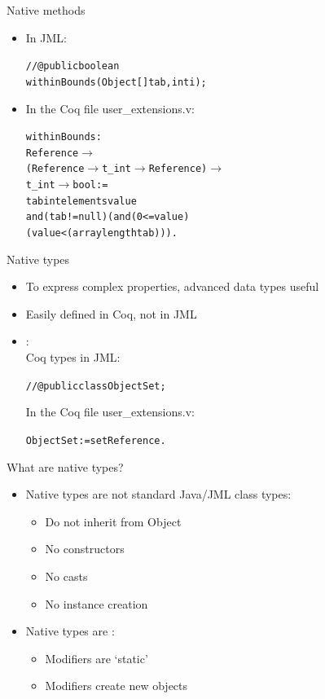 \documentclass[final,nocolorBG,a4,mobius,nototal,pdf,slideColor]{prosper}
\begin{document}
\begin{slide}{Native methods}
\begin{itemize}
\item In JML:
\begin{alltt}
//@ public  boolean 
       withinBounds(Object[] tab, int i);
\end{alltt}
\item In the Coq file user\_extensions.v:
\begin{alltt}
 withinBounds : 
  Reference \(\rightarrow\) 
  (Reference \(\rightarrow\) t\_int \(\rightarrow\) Reference)\(\rightarrow\)  
  t\_int \(\rightarrow\) bool := 
 tab intelements value \Blue{=>} 
    and (tab != null) (and (0 <= value) 
    (value < (arraylength tab))).
\end{alltt}
\end{itemize}
\end{slide}

\begin{slide}{Native types}
\begin{itemize}
\item To express complex properties, advanced data types useful
\item Easily defined in Coq, not in JML
\item {}: \\
Coq types in JML: 
\begin{alltt}
//@  public  class ObjectSet; 
\end{alltt}
In the Coq file user\_extensions.v:
\begin{alltt}
   ObjectSet := set Reference.
\end{alltt}
\end{itemize}
\end{slide}

\begin{slide}{What are native types?}
\begin{itemize}
\item Native types are not standard Java/JML class types:
\begin{itemize}
\item Do not inherit from Object
\item No constructors
\item No casts
\item No instance creation
\end{itemize}
\item Native types are : 
\begin{itemize}
\item Modifiers are `static'
\item Modifiers create new objects 
\end{itemize}
\end{itemize}
\end{slide}
\end{document}
